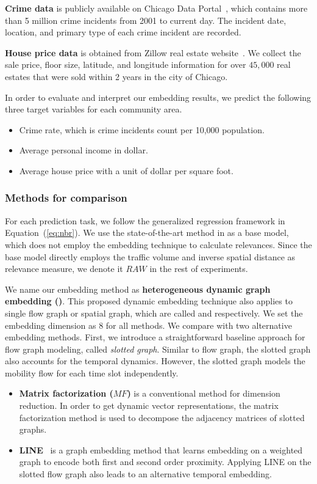 \textbf{Crime data} is publicly available on Chicago Data Portal~\cite{data-crime}, which contains more than 5 million crime incidents from 2001 to current day. The incident date, location, and primary type of each crime incident are recorded.

\textbf{House price data} is obtained from Zillow real estate website~\cite{data-houseprice}. We collect the sale price, floor size, latitude, and longitude information for over $45,000$ real estates that were sold within 2 years in the city of Chicago.
\smallskip

In order to evaluate and interpret our embedding results, we predict the following three target variables for each community area.
\begin{itemize}[leftmargin=*]
\item Crime rate, which is crime incidents count per 10,000 population.
\item Average personal income in dollar.
\item Average house price with a unit of dollar per square foot.
\end{itemize}


\subsubsection{Methods for comparison}

For each prediction task, we follow the generalized regression framework in Equation~(\ref{eq:nbr}). We use the state-of-the-art method in \cite{wang2016crime} as a base model, which does not employ the embedding technique to calculate relevances. Since the base model directly employs the traffic volume and inverse spatial distance as relevance measure, we denote it $RAW$ in the rest of experiments.

We name our embedding method as \textbf{heterogeneous dynamic graph embedding (\hdge)}. This proposed dynamic embedding technique also applies to single flow graph or spatial graph, which are called \dgef and \dges respectively. 
We set the embedding dimension as $8$ for all methods. We compare \hdge with two alternative embedding methods. First, we introduce a straightforward baseline approach for flow graph modeling, called \emph{slotted graph}. Similar to flow graph, the slotted graph also accounts for the temporal dynamics. However, the slotted graph models the mobility flow for each time slot independently.
\begin{itemize}[leftmargin=*]
\item \textbf{Matrix factorization ($MF$)} is a conventional method for dimension reduction. In order to get dynamic vector representations, the matrix factorization method is used to decompose the adjacency matrices of slotted graphs.
\item \textbf{LINE}~\cite{tang2015line} is a graph embedding method that learns embedding on a weighted graph to encode both first and second order proximity. Applying LINE on the slotted flow graph also leads to an alternative temporal embedding.
\end{itemize}


